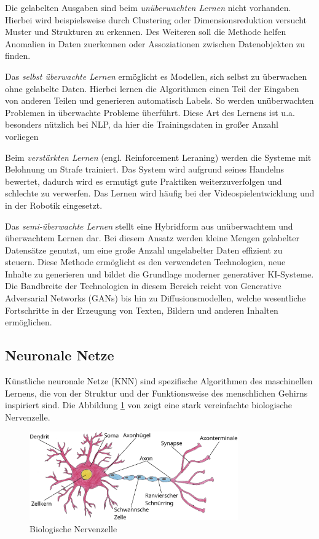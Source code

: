 Die gelabelten Ausgaben sind beim \textit{unüberwachten Lernen} nicht vorhanden. Hierbei wird beispielsweise durch Clustering oder Dimensionsreduktion versucht Muster und Strukturen zu erkennen. Des Weiteren soll die Methode helfen Anomalien in Daten zuerkennen oder Assoziationen zwischen Datenobjekten zu finden.\vspace{0.2cm}

Das \textit{selbst überwachte Lernen} ermöglicht es Modellen, sich selbst zu überwachen ohne gelabelte Daten. Hierbei lernen die Algorithmen einen Teil der Eingaben von anderen Teilen und generieren automatisch Labels. So werden unüberwachten Problemen in überwachte Probleme überführt. Diese Art des Lernens ist u.a. besonders nützlich bei NLP, da hier die Trainingsdaten in großer Anzahl vorliegen\vspace{0.2cm}

Beim \textit{verstärkten Lernen} (engl. Reinforcement Leraning) werden die Systeme mit Belohnung un Strafe trainiert. Das System wird aufgrund seines Handelns bewertet, dadurch wird es ermutigt gute Praktiken weiterzuverfolgen und schlechte zu verwerfen. Das Lernen wird häufig bei der Videospielentwicklung und in der Robotik eingesetzt.\vspace{0.2cm}

Das \textit{semi-überwachte Lernen} stellt eine Hybridform aus unüberwachtem und überwachtem Lernen dar. Bei diesem Ansatz werden kleine Mengen gelabelter Datensätze genutzt, um eine große Anzahl ungelabelter Daten effizient zu steuern. Diese Methode ermöglicht es den verwendeten Technologien, neue Inhalte zu generieren und bildet die Grundlage moderner generativer KI-Systeme. Die Bandbreite der Technologien in diesem Bereich reicht von Generative Adversarial Networks (GANs) bis hin zu Diffusionsmodellen, welche wesentliche Fortschritte in der Erzeugung von Texten, Bildern und anderen Inhalten ermöglichen.\vspace{0.2cm}


\subsection{Neuronale Netze}
Künstliche neuronale Netze (\acrshort{KNN}) sind spezifische Algorithmen des maschinellen Lernens, die von der Struktur und der Funktionsweise des menschlichen Gehirns inspiriert sind. Die Abbildung \ref{img:biological_neuron} von \cite{pahl-2024} zeigt eine stark vereinfachte biologische Nervenzelle.

\begin{figure}[!ht]
	\includegraphics[width=0.8\textwidth]{content/chapter_basics/images/biological_neuron.eps}
	\centering
	\caption{Biologische Nervenzelle}
	\label{img:biological_neuron}
\end{figure}

